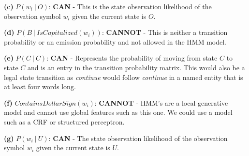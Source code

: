 \documentclass[11pt]{article}
\renewcommand\part[1]{\vspace{.10in}\textbf{(#1)}}
\begin{document}
\part{c} $P(w_i \ | \ O)$: \textbf{CAN} - This is the state observation likelihood of the observation symbol $w_i$ given the current state is $O$.

\part{d} $P(B \ | \ IsCapitalized(w_i))$: \textbf{CANNOT} - This is neither a transition probability or an emission probability and not allowed in the HMM model.

\part{e} $P(C \ | \ C)$: \textbf{CAN} - Represents the probability of moving from state $C$ to state $C$ and is an entry in the transition probability matrix. This would also be a legal state transition as \textit{continue} would follow \textit{continue} in a named entity that is at least four words long.

\part{f} $ContainsDollarSign(w_i)$: \textbf{CANNOT} - HMM's are a local generative model and cannot use global features such as this one. We could use a model such as a CRF or structured perceptron.

\part{g} $P(w_i \ | \ U)$: \textbf{CAN} - The state observation likelihood of the observation symbol $w_i$ given the current state is $U$.
\end{document}
